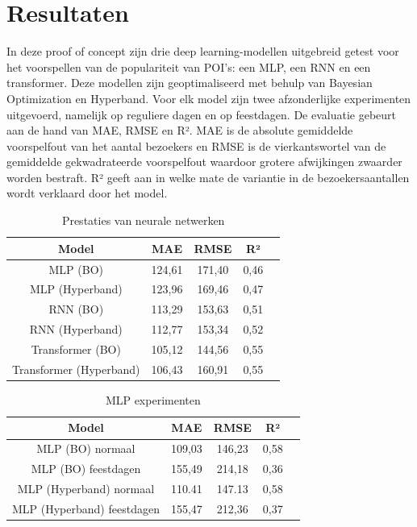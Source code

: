 \section{Resultaten}
In deze proof of concept zijn drie deep learning-modellen uitgebreid getest voor het voorspellen van de populariteit van POI’s: een MLP, een RNN en een transformer. Deze modellen zijn geoptimaliseerd met behulp van Bayesian Optimization en Hyperband. Voor elk model zijn twee afzonderlijke experimenten uitgevoerd, namelijk op reguliere dagen en op feestdagen. De evaluatie gebeurt aan de hand van MAE, RMSE en R². MAE is de absolute gemiddelde voorspelfout van het aantal bezoekers en RMSE is de vierkantswortel van de gemiddelde gekwadrateerde voorspelfout waardoor grotere afwijkingen zwaarder worden bestraft. R² geeft aan in welke mate de variantie in de bezoekersaantallen wordt verklaard door het model.

\begin{table}[H]
    \centering
    \begin{tabular}{|c|c|c|c|c|}
        \hline
        \textbf{Model} & MAE & RMSE & R² \\ \hline
        MLP (BO) & 124,61 & 171,40 & 0,46  \\ \hline
        MLP (Hyperband) & 123,96  & 169,46 & 0,47  \\ \hline
        RNN (BO) & 113,29  & 153,63 & 0,51 \\ \hline
        RNN (Hyperband) & 112,77  & 153,34 & 0,52  \\ \hline
        Transformer (BO) & 105,12  & 144,56 & 0,55  \\ \hline
        Transformer (Hyperband) & 106,43  & 160,91 & 0,55  \\ \hline
    \end{tabular}
    \caption{Prestaties van neurale netwerken}
\end{table}

\begin{table}[H]
    \centering
    \begin{tabular}{|c|c|c|c|c|}
        \hline
        \textbf{Model} & MAE & RMSE & R² \\ \hline
        MLP (BO) normaal & 109,03 & 146,23 & 0,58 \\ \hline
        MLP (BO) feestdagen & 155,49  & 214,18 & 0,36  \\ \hline
        MLP (Hyperband) normaal & 110.41 & 147.13 & 0,58  \\ \hline
        MLP (Hyperband) feestdagen & 155,47 & 212,36 & 0,37 \\ \hline
    \end{tabular}
    \caption{MLP experimenten}
\end{table}

